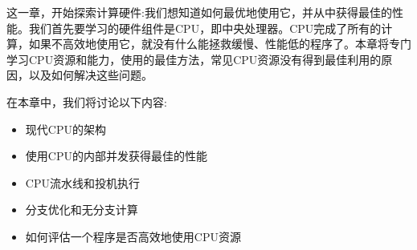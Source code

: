 这一章，开始探索计算硬件:我们想知道如何最优地使用它，并从中获得最佳的性能。我们首先要学习的硬件组件是CPU，即中央处理器。CPU完成了所有的计算，如果不高效地使用它，就没有什么能拯救缓慢、性能低的程序了。本章将专门学习CPU资源和能力，使用的最佳方法，常见CPU资源没有得到最佳利用的原因，以及如何解决这些问题。

在本章中，我们将讨论以下内容:

\begin{itemize}
\item 现代CPU的架构
\item 使用CPU的内部并发获得最佳的性能
\item CPU流水线和投机执行
\item 分支优化和无分支计算
\item 如何评估一个程序是否高效地使用CPU资源
\end{itemize}